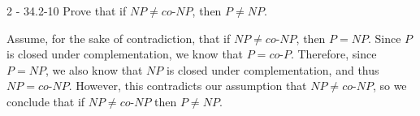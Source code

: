 \documentclass[11pt]{article}
\begin{document}
\begin{prob}{2 - 34.2-10}
Prove that if $NP \not= co$-$NP$, then $P \not= NP$.
\end{prob}
\begin{sol}

Assume, for the sake of contradiction, that if $NP \not= co$-$NP$, then $P = NP$. Since $P$ is closed under complementation, we know that $P = co$-$P$. Therefore, since $P = NP$, we also know that $NP$ is closed under complementation, and thus $NP = co$-$NP$. However, this contradicts our assumption that $NP \not= co$-$NP$, so we conclude that if $NP \not= co$-$NP$ then $P \not= NP$.
\end{sol}
\end{document}
